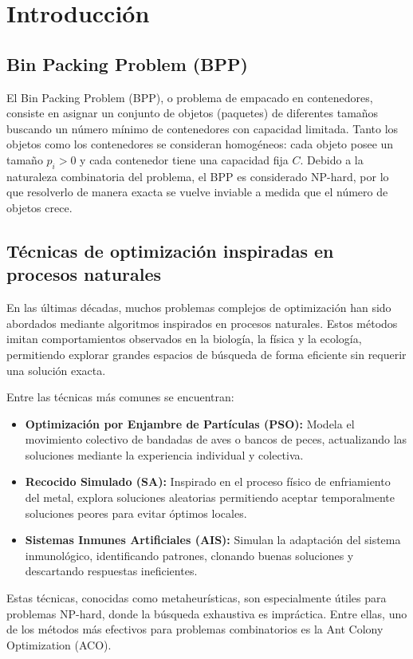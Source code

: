 \section{Introducción}
\subsection{Bin Packing Problem (BPP)}
El Bin Packing Problem (BPP), o problema de empacado en contenedores, consiste en asignar un conjunto de objetos (paquetes) de diferentes tamaños 
buscando un número mínimo de contenedores con capacidad limitada. Tanto los objetos como los contenedores se 
consideran homogéneos: cada objeto posee un tamaño $p_i > 0$ y cada contenedor tiene una capacidad fija $C$.  
Debido a la naturaleza combinatoria del problema, el BPP es considerado NP-hard, por lo que resolverlo de manera exacta se vuelve inviable 
a medida que el número de objetos crece.

\subsection{Técnicas de optimización inspiradas en procesos naturales}
En las últimas décadas, muchos problemas complejos de optimización han sido abordados mediante algoritmos inspirados en procesos naturales. 
Estos métodos imitan comportamientos observados en la biología, la física y la ecología, permitiendo explorar grandes espacios de búsqueda 
de forma eficiente sin requerir una solución exacta.

Entre las técnicas más comunes se encuentran:

\begin{itemize}
    \item \textbf{Optimización por Enjambre de Partículas (PSO):} Modela el movimiento colectivo de bandadas de aves o bancos de peces, 
          actualizando las soluciones mediante la experiencia individual y colectiva.
    \item \textbf{Recocido Simulado (SA):} Inspirado en el proceso físico de enfriamiento del metal, explora soluciones aleatorias 
          permitiendo aceptar temporalmente soluciones peores para evitar óptimos locales.
    \item \textbf{Sistemas Inmunes Artificiales (AIS):} Simulan la adaptación del sistema inmunológico, identificando patrones, clonando 
          buenas soluciones y descartando respuestas ineficientes.
\end{itemize}

Estas técnicas, conocidas como metaheurísticas, son especialmente útiles para problemas NP-hard, donde la búsqueda exhaustiva es impráctica. 
Entre ellas, uno de los métodos más efectivos para problemas combinatorios es la Ant Colony Optimization (ACO).

